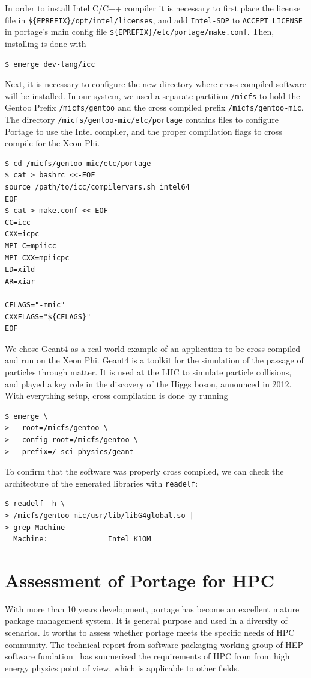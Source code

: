\documentclass[a4paper,conference]{IEEEtran}
\begin{document}
In order to install Intel C/C++ compiler it is necessary to first place
the license file in \verb|${EPREFIX}/opt/intel/licenses|, and add
\verb|Intel-SDP| to \verb|ACCEPT_LICENSE| in portage's main config file
\verb|${EPREFIX}/etc/portage/make.conf|. Then, installing is done with
\begin{verbatim}
$ emerge dev-lang/icc
\end{verbatim}

Next, it is necessary to configure the new directory where cross
compiled software will be installed. In our system, we used a separate
partition \verb|/micfs| to hold the Gentoo Prefix \verb|/micfs/gentoo|
and the cross compiled prefix \verb|/micfs/gentoo-mic|. The directory
\verb|/micfs/gentoo-mic/etc/portage| contains files to configure Portage
to use the Intel compiler, and the proper compilation flags to cross
compile for the Xeon Phi.

\begin{verbatim}
$ cd /micfs/gentoo-mic/etc/portage
$ cat > bashrc <<-EOF
source /path/to/icc/compilervars.sh intel64
EOF
$ cat > make.conf <<-EOF
CC=icc
CXX=icpc
MPI_C=mpiicc
MPI_CXX=mpiicpc
LD=xild
AR=xiar

CFLAGS="-mmic"
CXXFLAGS="${CFLAGS}"
EOF
\end{verbatim}

We chose Geant4 as a real world example of an application to be cross
compiled and run on the Xeon Phi. Geant4 is a toolkit for the
simulation of the passage of particles through matter. It is used at the
LHC to simulate particle collisions, and played a key role in the
discovery of the Higgs boson, announced in 2012. With everything setup,
cross compilation is done by running
\begin{verbatim}
$ emerge \
> --root=/micfs/gentoo \
> --config-root=/micfs/gentoo \
> --prefix=/ sci-physics/geant
\end{verbatim}

To confirm that the software was properly cross compiled, we can check
the architecture of the generated libraries with \verb|readelf|:
\begin{verbatim}
$ readelf -h \
> /micfs/gentoo-mic/usr/lib/libG4global.so |
> grep Machine
  Machine:              Intel K1OM
\end{verbatim}

\section{Assessment of Portage for HPC}
With more than 10 years development, portage has become an excellent
mature package management system.  It is general purpose and used in a
diversity of scenarios.  It worths to assess whether portage meets the
specific needs of HPC community.  The technical report from software
packaging working group of HEP software fundation~\cite{hsf:package}
has suumerized the requirements of HPC from from high energy physics
point of view, which is applicable to other fields.
\end{document}
